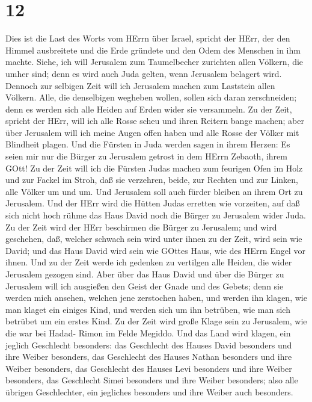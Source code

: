 \hypertarget{section-11}{%
\section{12}\label{section-11}}

 Dies ist die Last des Worts vom HErrn über Israel, spricht
der HErr, der den Himmel ausbreitete und die Erde gründete und den Odem
des Menschen in ihm machte.  Siehe, ich will Jerusalem zum
Taumelbecher zurichten allen Völkern, die umher sind; denn es wird auch
Juda gelten, wenn Jerusalem belagert wird.  Dennoch zur
selbigen Zeit will ich Jerusalem machen zum Laststein allen Völkern.
Alle, die denselbigen wegheben wollen, sollen sich daran zerschneiden;
denn es werden sich alle Heiden auf Erden wider sie versammeln.
 Zu der Zeit, spricht der HErr, will ich alle Rosse scheu
und ihren Reitern bange machen; aber über Jerusalem will ich meine Augen
offen haben und alle Rosse der Völker mit Blindheit plagen. 
Und die Fürsten in Juda werden sagen in ihrem Herzen: Es seien mir nur
die Bürger zu Jerusalem getrost in dem HErrn Zebaoth, ihrem GOtt!
 Zu der Zeit will ich die Fürsten Judas machen zum feurigen
Ofen im Holz und zur Fackel im Stroh, daß sie verzehren, beide, zur
Rechten und zur Linken, alle Völker um und um. Und Jerusalem soll auch
fürder bleiben an ihrem Ort zu Jerusalem.  Und der HErr wird
die Hütten Judas erretten wie vorzeiten, auf daß sich nicht hoch rühme
das Haus David noch die Bürger zu Jerusalem wider Juda.  Zu
der Zeit wird der HErr beschirmen die Bürger zu Jerusalem; und wird
geschehen, daß, welcher schwach sein wird unter ihnen zu der Zeit, wird
sein wie David; und das Haus David wird sein wie GOttes Haus, wie des
HErrn Engel vor ihnen.  Und zu der Zeit werde ich gedenken
zu vertilgen alle Heiden, die wider Jerusalem gezogen sind.
 Aber über das Haus David und über die Bürger zu Jerusalem
will ich ausgießen den Geist der Gnade und des Gebets; denn sie werden
mich ansehen, welchen jene zerstochen haben, und werden ihn klagen, wie
man klaget ein einiges Kind, und werden sich um ihn betrüben, wie man
sich betrübet um ein erstes Kind.  Zu der Zeit wird große
Klage sein zu Jerusalem, wie die war bei Hadad- Rimon im Felde Megiddo.
 Und das Land wird klagen, ein jeglich Geschlecht
besonders: das Geschlecht des Hauses David besonders und ihre Weiber
besonders, das Geschlecht des Hauses Nathan besonders und ihre Weiber
besonders,  das Geschlecht des Hauses Levi besonders und
ihre Weiber besonders, das Geschlecht Simei besonders und ihre Weiber
besonders;  also alle übrigen Geschlechter, ein jegliches
besonders und ihre Weiber auch besonders.

